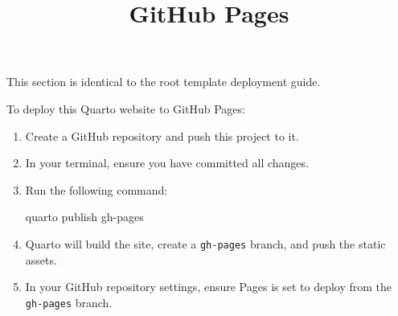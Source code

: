 \documentclass[
]{report}
\title{GitHub Pages}
\author{}
\date{}
\newenvironment{Shaded}{\begin{snugshade}}{\end{snugshade}}
\newcommand{\ExtensionTok}[1]{\textcolor[rgb]{0.00,0.23,0.31}{#1}}
\newcommand{\NormalTok}[1]{\textcolor[rgb]{0.00,0.23,0.31}{#1}}
\renewcommand*\contentsname{Table of contents}
\newcommand\contentsname{Table of contents}
\begin{document}
\maketitle

\renewcommand*\contentsname{Table of contents}
{
\hypersetup{linkcolor=}
\setcounter{tocdepth}{2}
\tableofcontents
}

This section is identical to the root template deployment guide.

To deploy this Quarto website to GitHub Pages:

\begin{enumerate}
\def\labelenumi{\arabic{enumi}.}
\item
  Create a GitHub repository and push this project to it.
\item
  In your terminal, ensure you have committed all changes.
\item
  Run the following command:

\begin{Shaded}
\begin{Highlighting}[]
\ExtensionTok{quarto}\NormalTok{ publish gh{-}pages}
\end{Highlighting}
\end{Shaded}
\item
  Quarto will build the site, create a \texttt{gh-pages} branch, and
  push the static assets.
\item
  In your GitHub repository settings, ensure Pages is set to deploy from
  the \texttt{gh-pages} branch.
\end{enumerate}
\end{document}
